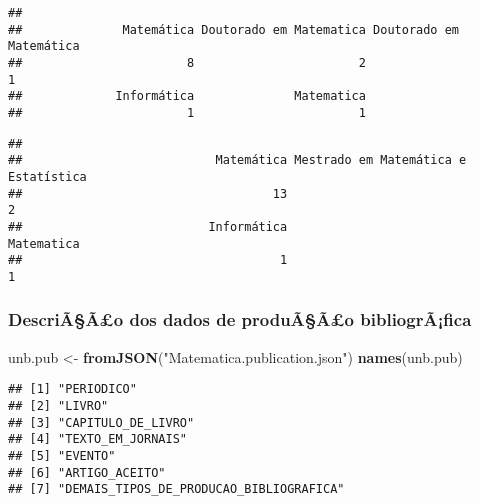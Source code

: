 \documentclass[]{article}
\newenvironment{Shaded}{\begin{snugshade}}{\end{snugshade}}
\newcommand{\KeywordTok}[1]{\textcolor[rgb]{0.13,0.29,0.53}{\textbf{#1}}}
\newcommand{\DataTypeTok}[1]{\textcolor[rgb]{0.13,0.29,0.53}{#1}}
\newcommand{\DecValTok}[1]{\textcolor[rgb]{0.00,0.00,0.81}{#1}}
\newcommand{\StringTok}[1]{\textcolor[rgb]{0.31,0.60,0.02}{#1}}
\newcommand{\OtherTok}[1]{\textcolor[rgb]{0.56,0.35,0.01}{#1}}
\newcommand{\OperatorTok}[1]{\textcolor[rgb]{0.81,0.36,0.00}{\textbf{#1}}}
\newcommand{\NormalTok}[1]{#1}
\begin{document}
\begin{verbatim}
## 
##              Matemática Doutorado em Matematica Doutorado em Matemática 
##                       8                       2                       1 
##             Informática              Matematica 
##                       1                       1
\end{verbatim}

\begin{Shaded}
\end{Shaded}

\begin{verbatim}
## 
##                           Matemática Mestrado em Matemática e Estatística 
##                                   13                                    2 
##                          Informática                           Matematica 
##                                    1                                    1
\end{verbatim}

\subsubsection{DescriÃ§Ã£o dos dados de produÃ§Ã£o
bibliogrÃ¡fica}\label{descriaao-dos-dados-de-produaao-bibliografica}

\begin{Shaded}
\begin{Highlighting}[]
\NormalTok{unb.pub <-}\StringTok{ }\KeywordTok{fromJSON}\NormalTok{(}\StringTok{"Matematica.publication.json"}\NormalTok{)}
\KeywordTok{names}\NormalTok{(unb.pub)}
\end{Highlighting}
\end{Shaded}

\begin{verbatim}
## [1] "PERIODICO"                             
## [2] "LIVRO"                                 
## [3] "CAPITULO_DE_LIVRO"                     
## [4] "TEXTO_EM_JORNAIS"                      
## [5] "EVENTO"                                
## [6] "ARTIGO_ACEITO"                         
## [7] "DEMAIS_TIPOS_DE_PRODUCAO_BIBLIOGRAFICA"
\end{verbatim}
\end{document}

